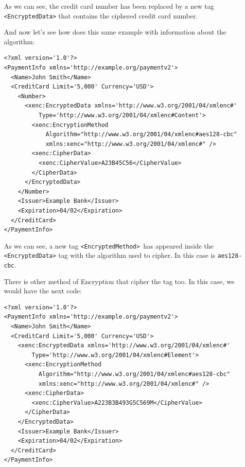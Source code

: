 As we can see, the credit card number has been replaced by a new 
tag \texttt{\textless EncryptedData\textgreater} that contains the ciphered credit card number.


And now let's see how does this same example with information about the algorithm:

\begin{lstlisting}[label=xmlenc_example_1_3,caption=Ciphered xml content
with algorithm information]
<?xml version='1.0'?>
<PaymentInfo xmlns='http://example.org/paymentv2'>
  <Name>John Smith</Name>
  <CreditCard Limit='5,000' Currency='USD'>
    <Number>
      <xenc:EncryptedData xmlns='http://www.w3.org/2001/04/xmlenc#'
          Type='http://www.w3.org/2001/04/xmlenc#Content'>
        <xenc:EncryptionMethod  
            Algorithm="http://www.w3.org/2001/04/xmlenc#aes128-cbc"  
            xmlns:xenc="http://www.w3.org/2001/04/xmlenc#" />  
        <xenc:CipherData>
          <xenc:CipherValue>A23B45C56</CipherValue>
        </CipherData>
      </EncryptedData>
    </Number>
    <Issuer>Example Bank</Issuer>
    <Expiration>04/02</Expiration>
  </CreditCard>
</PaymentInfo>
\end{lstlisting}

As we can see, a new tag \texttt{\textless EncryptedMethod\textgreater}\ has
appeared
inside the \texttt{\textless EncryptedData\textgreater} tag with the algorithm used to cipher. In this case
is \texttt{aes128-cbc}. 

There is other method of Encryption that cipher the tag too. In this case,
we would have the next code:

\begin{lstlisting}[label=xmlenc_example_1_4,caption=Ciphered xml content
including the tag itself]
<?xml version='1.0'?>
<PaymentInfo xmlns='http://example.org/paymentv2'>
  <Name>John Smith</Name>
  <CreditCard Limit='5,000' Currency='USD'>
    <xenc:EncryptedData xmlns='http://www.w3.org/2001/04/xmlenc#'
        Type='http://www.w3.org/2001/04/xmlenc#Element'>
      <xenc:EncryptionMethod  
          Algorithm="http://www.w3.org/2001/04/xmlenc#aes128-cbc"  
          xmlns:xenc="http://www.w3.org/2001/04/xmlenc#" />  
      <xenc:CipherData>
        <xenc:CipherValue>A223B3B493G5C569M</CipherValue>
      </CipherData>
    </EncryptedData>
    <Issuer>Example Bank</Issuer>
    <Expiration>04/02</Expiration>
  </CreditCard>
</PaymentInfo>
\end{lstlisting}

